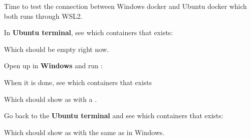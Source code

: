 
Time to test the connection between Windows docker and Ubuntu docker which both runs through WSL2.

In \textbf{Ubuntu terminal}, see which containers that exists:


Which should be empty right now.

Open up  in \textbf{Windows} and run :


When it is done, see which containers that exists


Which should show  as  with a .


Go back to the \textbf{Ubuntu terminal} and see which containers that exists:


Which should show  as  with the same  as in Windows.